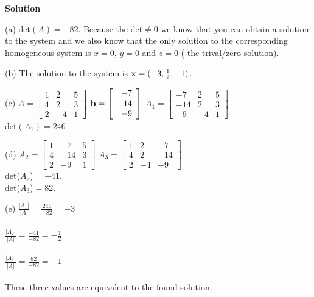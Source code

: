 \noindent \textbf{Solution} \begin{description}\item (a)
det$(A)=-82$. Because the det$\neq0$ we know that you
can obtain a solution to the system and we also know that the only
solution to the corresponding homogeneous system is $x=0$, $y=0$
and $z=0$ ( the trival/zero solution).
\item (b)
\noindent The solution to the system is ${\bf
x}=(-3,\frac{1}{2},-1)$.
\item (c)
$A=\left [ \begin{array}{rrr}
                      1&2&5\\
                      4&2&3\\
                      2&-4&1\end{array} \right]$ \quad \quad
${\bf b}=\left [ \begin{array}{r}
                              -7\\
                              -14\\
                              -9\end{array} \right]$ \quad \quad
$A_{1}=\left [\begin{array}{rrr}
                            -7&2&5\\
                            -14&2&3\\
                            -9&-4&1\end{array} \right]$\\

det$(A_1)=246$
\item (d)
$A_{2}=\left [\begin{array}{rrr}
                            1&-7&5\\
                            4&-14&3\\
                            2&-9&1\end{array} \right]$ \quad
$A_{3}=\left [\begin{array}{rrr}
                            1&2&-7\\
                            4&2&-14\\
                            2&-4&-9\end{array} \right]$\\

det($A_{2}$)$=-41$.\\
det($A_{3}$)$=82$.
\item (e)
$\frac{|A_{1}|}{|A|}=\frac{246}{-82}=-3$\\ \\
$\frac{|A_{2}|}{|A|}=\frac{-41}{-82}=-\frac{1}{2}$\\ \\
$\frac{|A_{3}|}{|A|}=\frac{82}{-82}=-1$\\ \\
\noindent These three values are equivalent to the found solution.
\end{description}

\newpage
\markboth{}{} 
